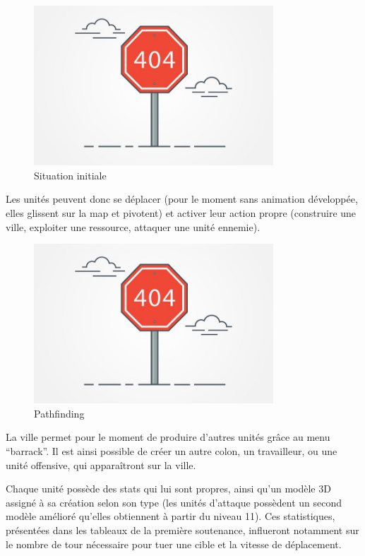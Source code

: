 \documentclass[12pt]{report}
\begin{document}
\begin{figure}[H]
    \centering
    \includegraphics[width=0.8\textwidth]{404}
    \caption{Situation initiale}
\end{figure}

Les unités peuvent donc se déplacer (pour le moment sans animation développée, elles glissent sur la map et pivotent) et activer leur action propre (construire une ville, exploiter une ressource, attaquer une unité ennemie).

\begin{figure}[H]
    \centering
    \includegraphics[width=0.8\textwidth]{404}
    \caption{Pathfinding}
\end{figure}

La ville permet pour le moment de produire d’autres unités grâce au menu “barrack”. Il est ainsi possible de créer un autre colon, un travailleur, ou une unité offensive, qui apparaîtront sur la ville.

Chaque unité possède des stats qui lui sont propres, ainsi qu’un modèle 3D assigné à sa création selon son type (les unités d’attaque possèdent un second modèle amélioré qu’elles obtiennent à partir du niveau 11). Ces statistiques, présentées dans les tableaux de la première soutenance, influeront notamment sur le nombre de tour nécessaire pour tuer une cible et  la vitesse de déplacement.
\end{document}
